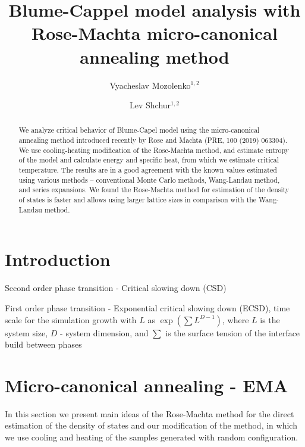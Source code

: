 \documentclass[aps,prl,amssymb,amsmath,twocolumn,floatfix]{revtex4}
\begin{document}
\title{Blume-Cappel model analysis with Rose-Machta micro-canonical annealing method}
\author{Vyacheslav Mozolenko$^{1,2}$}
\author{Lev Shchur$^{1, 2}$}


\begin{abstract}
We analyze critical behavior of Blume-Capel model using the micro-canonical annealing method introduced recently by Rose and Machta (PRE, 100 (2019) 063304). We use cooling-heating modification of the Rose-Machta method, and estimate entropy of the model and calculate energy and specific heat, from which we estimate critical temperature. The results are in a good agreement with the known values estimated using various methods -- conventional Monte Carlo methods, Wang-Landau method, and series expansions. We found the Rose-Machta method for estimation of the density of states is faster and allows using larger lattice sizes in comparison with the Wang-Landau method.

\end{abstract}

\maketitle

\section{Introduction}


Second order phase transition - Critical slowing down (CSD)

First order phase transition - Exponential critical slowing down (ECSD), time scale for the simulation growth with $L$ as $\exp\left(\sum L^{D-1}\right)$, where $L$ is the system size, $D$ - system dimension, and $\sum$ is the surface tension of the interface build between phases~\cite{VMM-2007}


\section{Micro-canonical annealing - EMA}

In this section we present main ideas of the Rose-Machta method for the direct estimation of the density of states and our modification of the method, in which we use cooling and heating of the samples generated with random configuration. 
\end{document}
